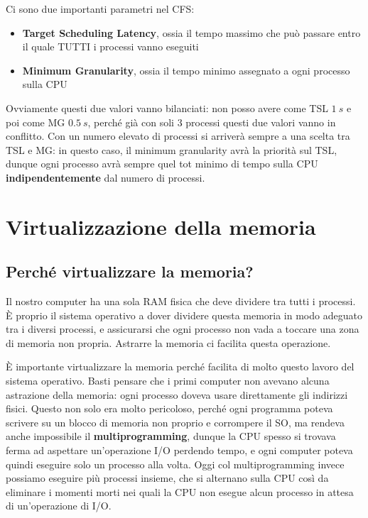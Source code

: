 \documentclass[11pt, a4paper, titlepage, oneside]{scrbook}
\begin{document}
Ci sono due importanti parametri nel CFS:
\begin{itemize}
    \item \textbf{Target Scheduling Latency}, ossia il tempo massimo che può passare entro il quale TUTTI i processi vanno eseguiti
    \item \textbf{Minimum Granularity}, ossia il tempo minimo assegnato a ogni processo sulla CPU
\end{itemize}

Ovviamente questi due valori vanno bilanciati: non posso avere come TSL $\SI{1}{s}$ e poi come MG $\SI{0.5}{s}$, perché già con soli 3 processi questi due valori vanno in conflitto. Con un numero elevato di processi si arriverà sempre a una scelta tra TSL e MG: in questo caso, il minimum granularity avrà la priorità sul TSL, dunque ogni processo avrà sempre quel tot minimo di tempo sulla CPU \textbf{indipendentemente} dal numero di processi.

\section{Virtualizzazione della memoria}

\subsection{Perché virtualizzare la memoria?}

Il nostro computer ha una sola RAM fisica che deve dividere tra tutti i processi. È proprio il sistema operativo a dover dividere questa memoria in modo adeguato tra i diversi processi, e assicurarsi che ogni processo non vada a toccare una zona di memoria non propria. Astrarre la memoria ci facilita questa operazione. 

È importante virtualizzare la memoria perché facilita di molto questo lavoro del sistema operativo. Basti pensare che i primi computer non avevano alcuna astrazione della memoria: ogni processo doveva usare direttamente gli indirizzi fisici. Questo non solo era molto pericoloso, perché ogni programma poteva scrivere su un blocco di memoria non proprio e corrompere il SO, ma rendeva anche impossibile il \textbf{multiprogramming}, dunque la CPU spesso si trovava ferma ad aspettare un'operazione I/O perdendo tempo, e ogni computer poteva quindi eseguire solo un processo alla volta. Oggi col multiprogramming invece possiamo eseguire più processi insieme, che si alternano sulla CPU così da eliminare i momenti morti nei quali la CPU non esegue alcun processo in attesa di un'operazione di I/O.  
\end{document}

